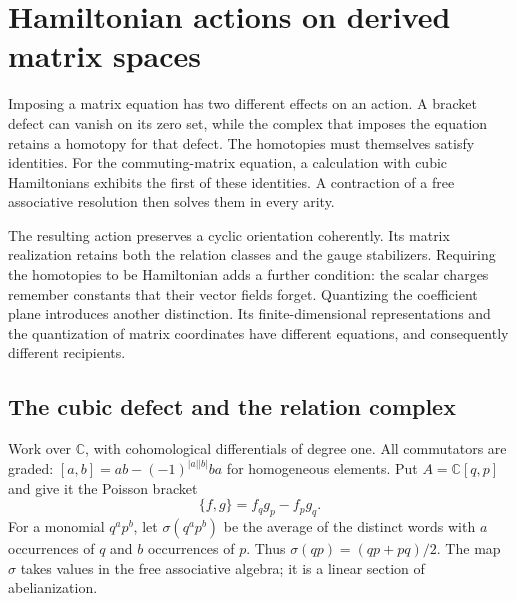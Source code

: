 \chapter{Hamiltonian actions on derived matrix spaces}
\label{ch:vol2-derived-hamiltonian-actions}

Imposing a matrix equation has two different effects on an action.
A bracket defect can vanish on its zero set, while the complex
that imposes the equation retains a homotopy for that defect.
The homotopies must themselves satisfy identities. For the
commuting-matrix equation, a calculation with cubic Hamiltonians
exhibits the first of these identities. A contraction of a free
associative resolution then solves them in every arity.

The resulting action preserves a cyclic orientation coherently.
Its matrix realization retains both the relation classes and the
gauge stabilizers. Requiring the homotopies to be Hamiltonian adds
a further condition: the scalar charges remember constants that
their vector fields forget. Quantizing the coefficient plane
introduces another distinction. Its finite-dimensional
representations and the quantization of matrix coordinates have
different equations, and consequently different recipients.

\section{The cubic defect and the relation complex}
\label{sec:vol2-matrix-cubic-defect}

Work over $\mathbb C$, with cohomological differentials of degree
one. All commutators are graded:
$[a,b]=ab-(-1)^{|a||b|}ba$ for homogeneous elements.
Put $A=\mathbb C[q,p]$ and give it the Poisson bracket
\[
 \{f,g\}=f_qg_p-f_pg_q.
\]
For a monomial $q^ap^b$, let $\sigma(q^ap^b)$ be the average of
the distinct words with $a$ occurrences of $q$ and $b$ occurrences of $p$.
Thus $\sigma(qp)=(qp+pq)/2$. The map $\sigma$ takes values in
the free associative algebra; it is a linear section of
abelianization.

